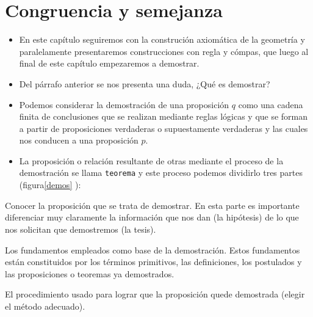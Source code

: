 \chapter[
     image=cap3a,%
     image caption={The global option open right, triggers the typesetting of chapter on odd pages only. There are a  couple of layouts that must be typeset on an even pages.}]%
{Congruencia y semejanza}
{\begin{itemize}
\item En este cap\'itulo seguiremos con la construci\'on axiomática de la geometr\'ia y paralelamente presentaremos construcciones con regla y c\'ompas, que luego al
final de este cap\'itulo empezaremos a demostrar.
\item Del párrafo anterior se nos presenta una duda, ¿Qué es demostrar? 
\item Podemos considerar la demostración de una proposición $q$ como una cadena finita
de conclusiones que se realizan mediante reglas lógicas y que se forman a partir
de proposiciones verdaderas o supuestamente verdaderas y las cuales nos conducen
a una proposición $p$.
\item La proposición o relación resultante de otras mediante el proceso de la
demostración se llama \texttt{teorema} y este proceso podemos dividirlo
tres partes (figura\ref{demos} ):
\end{itemize}
\begin{lista}
\item  Conocer la proposición que se trata de demostrar. En esta parte es
importante diferenciar muy claramente la información que nos dan (la
hipótesis) de lo que nos solicitan que demostremos (la tesis).
\item Los fundamentos empleados como base de la demostración. Estos fundamentos
   están constituidos por los términos primitivos, las definiciones, los
postulados y las proposiciones o teoremas ya demostrados.
\item  El procedimiento usado para lograr que la proposición quede demostrada
(elegir el método adecuado).
\end{lista}}
